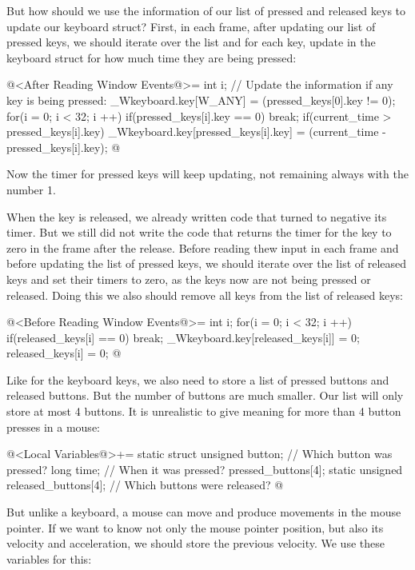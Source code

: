 But how should we use the information of our list of pressed and
released keys to update our keyboard struct? First, in each frame,
after updating our list of pressed keys, we should iterate over the
list and for each key, update in the keyboard struct for how much time
they are being pressed:

\iniciocodigo
@<After Reading Window Events@>=
{
  int i;
  // Update the information if any key is being pressed:
  _Wkeyboard.key[W_ANY] = (pressed_keys[0].key != 0);
  for(i = 0; i < 32; i ++){
    if(pressed_keys[i].key == 0)
      break;
    if(current_time > pressed_keys[i].key)
      _Wkeyboard.key[pressed_keys[i].key] = (current_time - pressed_keys[i].key);
  }
}
@
\fimcodigo

Now the timer for pressed keys will keep updating, not remaining
always with the number 1.

When the key is released, we already written code that turned to
negative its timer. But we still did not write the code that returns
the timer for the key to zero in the frame after the release. Before
reading thew input in each frame and before updating the list of
pressed keys, we should iterate over the list of released keys and set
their timers to zero, as the keys now are not being pressed or
released. Doing this we also should remove all keys from the list of
released keys:

\iniciocodigo
@<Before Reading Window Events@>=
{
  int i;
  for(i = 0; i < 32; i ++){
    if(released_keys[i] == 0)
      break;
    _Wkeyboard.key[released_keys[i]] = 0;
    released_keys[i] = 0;
  }
}
@
\fimcodigo


Like for the keyboard keys, we also need to store a list of pressed
buttons and released buttons. But the number of buttons are much
smaller. Our list will only store at most 4 buttons. It is unrealistic
to give meaning for more than 4 button presses in a mouse:

\iniciocodigo
@<Local Variables@>+=
static struct{
  unsigned button; // Which button was pressed?
  long time;       // When it was pressed?
} pressed_buttons[4];
static unsigned released_buttons[4]; // Which buttons were released?
@
\fimcodigo

But unlike a keyboard, a mouse can move and produce movements in the
mouse pointer. If we want to know not only the mouse pointer position,
but also its velocity and acceleration, we should store the previous
velocity. We use these variables for this:

